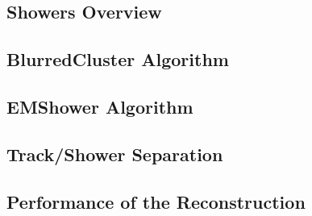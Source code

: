 \subsection{Showers Overview}\label{sec:ShowersOverview}

\subsection{BlurredCluster Algorithm}\label{sec:BlurredCluster}

\subsection{EMShower Algorithm}\label{sec:EMShower}

\subsection{Track/Shower Separation}\label{sec:TrackShowerSeparation}

\subsection{Performance of the Reconstruction}\label{sec:ReconstructionPerformance}
